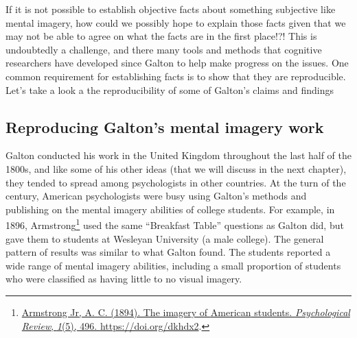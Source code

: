 \documentclass[
  oneside,
  12pt]{crumpbook}
\begin{document}
If it is not possible to establish objective facts about something subjective like mental imagery, how could we possibly hope to explain those facts given that we may not be able to agree on what the facts are in the first place!?! This is undoubtedly a challenge, and there many tools and methods that cognitive researchers have developed since Galton to help make progress on the issues. One common requirement for establishing facts is to show that they are reproducible. Let's take a look a the reproducibility of some of Galton's claims and findings

\hypertarget{reproducing-galtons-mental-imagery-work}{%
\subsection{Reproducing Galton's mental imagery work}\label{reproducing-galtons-mental-imagery-work}}

Galton conducted his work in the United Kingdom throughout the last half of the 1800s, and like some of his other ideas (that we will discuss in the next chapter), they tended to spread among psychologists in other countries. At the turn of the century, American psychologists were busy using Galton's methods and publishing on the mental imagery abilities of college students. For example, in 1896, Armstrong\footnote{\protect\hyperlink{ref-armstrongjrImageryAmericanStudents1894}{Armstrong Jr, A. C. (1894). The imagery of {American} students. \emph{Psychological Review}, \emph{1}(5), 496. \url{https://doi.org/dkhdx2}}.} used the same ``Breakfast Table'' questions as Galton did, but gave them to students at Wesleyan University (a male college). The general pattern of results was similar to what Galton found. The students reported a wide range of mental imagery abilities, including a small proportion of students who were classified as having little to no visual imagery.
\end{document}
